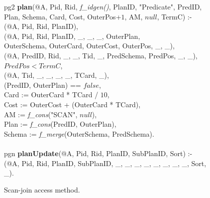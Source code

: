 \begin{figure}
\ssp
\centering
\begin{boxedminipage}{\linewidth}
pg2 {\bf plan}(@A, Pid, Rid, {\em f\_idgen()}, PlanID, "Predicate", PredID, \\
\datalogspace \xspace Plan, Schema, Card, Cost, OuterPos+$1$, AM, $null$, TermC) :-\\
(@A, Pid, Rid, PlanID),\\
(@A, Pid, Rid, PlanID, \_, \_, \_, OuterPlan, \\
\datalogspace \datalogspace OuterSchema, OuterCard, OuterCost, OuterPos, \_, \_),  \\   
(@A, PredID, Rid, \_, \_, Tid, \_, PredSchema, PredPos, \_, \_),\\
\datalogspace $PredPos < TermC$,\\
(@A, Tid, \_, \_, \_, \_, TCard, \_),\\
(PredID, OuterPlan) == $false$,\\
\datalogspace Card := OuterCard * TCard / $10$,\\
\datalogspace Cost := OuterCost + (OuterCard * TCard),\\
\datalogspace AM := {\em f\_cons}("SCAN", $null$), \\
\datalogspace Plan := {\em f\_cons}(PredID, OuterPlan), \\
\datalogspace Schema := {\em f\_merge}(OuterSchema, PredSchema).\\
\\
pgn {\bf planUpdate}(@A, Pid, Rid, PlanID, SubPlanID, Sort) :- \\
(@A, Pid, Rid, PlanID, SubPlanID, \_, \_, \_, \_, \_, \_, \_, \_, Sort, \_).
\end{boxedminipage}
\caption{\label{ch:evita:fig:plangen1}Scan-join access method.}
\end{figure}

